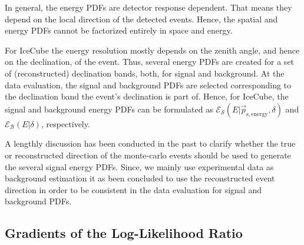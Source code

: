 \documentclass{article}
\begin{document}
In general, the energy PDFs are detector response dependent. That means they
depend on the local direction of the detected events. Hence, the spatial and
energy PDFs cannot be factorized entirely in space and energy.

For IceCube the energy resolution mostly depends on the zenith angle, and hence
on the declination, of the event. Thus, several energy PDFs are created for a
set of (reconstructed) declination bands, both, for signal and background. At
the data evaluation, the signal and background PDFs are selected corresponding
to the declination band the event's declination is part of. Hence, for IceCube,
the signal and background energy PDFs can be formulated as
$\mathcal{E}_{\mathcal{S}}(E|\vec{p}_{\mathrm{s,energy}},\delta)$ and
$\mathcal{E}_{\mathcal{B}}(E|\delta)$, respectively.

A lengthly discussion has been conducted in the past to clarify whether the true or
reconstructed direction of the monte-carlo events should be used to generate
the several signal energy PDFs. Since, we mainly use experimental data as
background estimation it as been concluded to use the reconstructed event
direction in order to be consistent in the data evaluation for signal and
background PDFs.

\subsection{Gradients of the Log-Likelihood Ratio}
\end{document}
